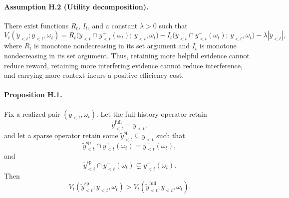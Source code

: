 \paragraph{Assumption H.2 (Utility decomposition).}
There exist functions \(R_t\), \(I_t\), and a constant \(\lambda>0\) such that
\begin{equation}
V_t(\widetilde y_{<t}; y_{<t}, \omega_t)
=
R_t\!\bigl(\widetilde y_{<t}\cap y_{<t}^{+}(\omega_t);\, y_{<t},\omega_t\bigr)
-
I_t\!\bigl(\widetilde y_{<t}\cap y_{<t}^{-}(\omega_t);\, y_{<t},\omega_t\bigr)
-
\lambda |\widetilde y_{<t}|,
\label{eq:app_sparse_decomp_value}
\end{equation}
where \(R_t\) is monotone nondecreasing in its set argument and \(I_t\) is monotone nondecreasing in its set argument.
Thus, retaining more helpful evidence cannot reduce reward, retaining more interfering evidence cannot reduce interference, and carrying more context incurs a positive efficiency cost.

\paragraph{Proposition H.1.}
Fix a realized pair \((y_{<t},\omega_t)\).
Let the full-history operator retain
\begin{equation}
\widetilde y_{<t}^{\mathrm{full}} = y_{<t},
\label{eq:app_full_history}
\end{equation}
and let a sparse operator retain some
\(\widetilde y_{<t}^{\mathrm{sp}}\subseteq y_{<t}\)
such that
\begin{equation}
\widetilde y_{<t}^{\mathrm{sp}}\cap y_{<t}^{+}(\omega_t)
=
y_{<t}^{+}(\omega_t),
\label{eq:app_sparse_keep_helpful}
\end{equation}
and
\begin{equation}
\widetilde y_{<t}^{\mathrm{sp}}\cap y_{<t}^{-}(\omega_t)
\subsetneq
y_{<t}^{-}(\omega_t).
\label{eq:app_sparse_drop_interfere}
\end{equation}
Then
\begin{equation}
V_t(\widetilde y_{<t}^{\mathrm{sp}}; y_{<t}, \omega_t)
>
V_t(\widetilde y_{<t}^{\mathrm{full}}; y_{<t}, \omega_t).
\label{eq:app_sparse_strict_gain}
\end{equation}

